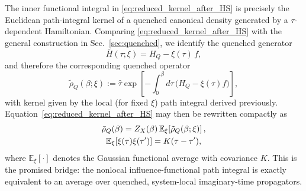 The inner functional integral in \eqref{eq:reduced_kernel_after_HS} is precisely
the Euclidean path-integral kernel of a quenched canonical density generated by
a $\tau$-dependent Hamiltonian. Comparing \eqref{eq:reduced_kernel_after_HS} with
the general construction in Sec.~\ref{sec:quenched}, we identify the quenched
generator
\begin{equation}
    \bar H(\tau;\xi)=H_Q-\xi(\tau)\,f,
    \label{eq:quenched_generator_identification}
\end{equation}
and therefore the corresponding quenched operator
\begin{equation}
    \tilde\rho_Q(\beta;\xi)
    :=
    \hat\tau\exp\!\left[-\int_0^\beta d\tau\,\big(H_Q-\xi(\tau)f\big)\right],
    \label{eq:tilde_rho_def_again}
\end{equation}
with kernel given by the local (for fixed $\xi$) path integral derived previously.
Equation~\eqref{eq:reduced_kernel_after_HS} may then be rewritten compactly as
\begin{gather}
    \bar\rho_Q(\beta)
    =
    Z_X(\beta)\,\mathbb E_\xi\!\left[\tilde\rho_Q(\beta;\xi)\right],
    \label{eq:bar_rho_as_quenched_average_final}
    \\
    \mathbb E_\xi[\xi(\tau)\xi(\tau')]=K(\tau-\tau'), \notag
\end{gather}
where $\mathbb E_\xi[\cdot]$ denotes the Gaussian functional average with
covariance $K$. This is the promised bridge: the nonlocal influence-functional
path integral is exactly equivalent to an average over quenched, system-local
imaginary-time propagators.

